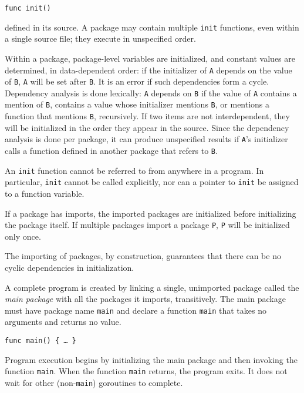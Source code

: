 \begin{Verbatim}[frame=single]
func init()
\end{Verbatim}

defined in its source. A package may contain multiple \texttt{init}
functions, even within a single source file; they execute in unspecified
order.

Within a package, package-level variables are initialized, and constant
values are determined, in data-dependent order: if the initializer of
\texttt{A} depends on the value of \texttt{B}, \texttt{A} will be set
after \texttt{B}. It is an error if such dependencies form a cycle.
Dependency analysis is done lexically: \texttt{A} depends on \texttt{B}
if the value of \texttt{A} contains a mention of \texttt{B}, contains a
value whose initializer mentions \texttt{B}, or mentions a function that
mentions \texttt{B}, recursively. If two items are not interdependent,
they will be initialized in the order they appear in the source. Since
the dependency analysis is done per package, it can produce unspecified
results if \texttt{A}'s initializer calls a function defined in another
package that refers to \texttt{B}.

An \texttt{init} function cannot be referred to from anywhere in a
program. In particular, \texttt{init} cannot be called explicitly, nor
can a pointer to \texttt{init} be assigned to a function variable.

If a package has imports, the imported packages are initialized before
initializing the package itself. If multiple packages import a package
\texttt{P}, \texttt{P} will be initialized only once.

The importing of packages, by construction, guarantees that there can be
no cyclic dependencies in initialization.

A complete program is created by linking a single, unimported package
called the \emph{main package} with all the packages it imports,
transitively. The main package must have package name \texttt{main} and
declare a function \texttt{main} that takes no arguments and returns no
value.

\begin{Verbatim}[frame=single]
func main() { … }
\end{Verbatim}

Program execution begins by initializing the main package and then
invoking the function \texttt{main}. When the function \texttt{main}
returns, the program exits. It does not wait for other
(non-\texttt{main}) goroutines to complete.

